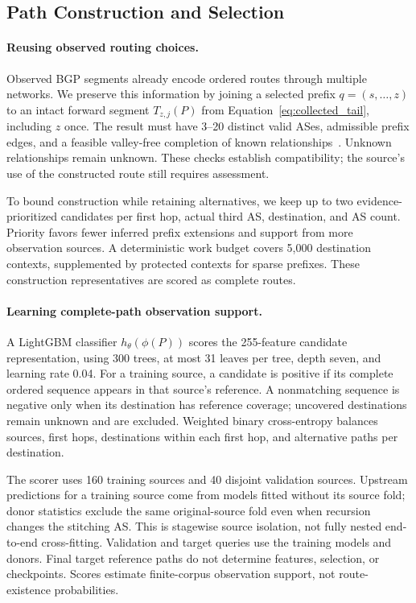 \subsection{Path Construction and Selection}
\label{sec:generation}
\label{sec:path_selection}

\paragraph{Reusing observed routing choices.}
Observed BGP segments already encode ordered routes through multiple
networks. We preserve this information by joining a selected prefix
$q=(s,\ldots,z)$ to an intact forward segment $T_{z,j}(P)$ from
Equation~\eqref{eq:collected_tail}, including $z$ once. The result must have
3--20 distinct valid ASes, admissible prefix edges, and a feasible
valley-free completion of known relationships~\cite{gao2001inferring}.
Unknown relationships remain unknown. These checks establish compatibility;
the source's use of the constructed route still requires assessment.

To bound construction while retaining alternatives, we keep up to two
evidence-prioritized candidates per first hop, actual third AS, destination,
and AS count. Priority favors fewer inferred prefix extensions and support
from more observation sources. A deterministic work budget covers 5,000
destination contexts, supplemented by protected contexts for sparse
prefixes. These construction representatives are scored as complete routes.

\paragraph{Learning complete-path observation support.}
A LightGBM classifier $h_\theta(\phi(P))$ scores the 255-feature candidate
representation, using 300 trees, at most 31 leaves per tree, depth seven,
and learning rate 0.04. For a training source, a candidate is positive if its
complete ordered sequence appears in that source's reference. A
nonmatching sequence is negative only when its destination has reference
coverage; uncovered destinations remain unknown and are excluded.
Weighted binary cross-entropy balances sources, first hops, destinations
within each first hop, and alternative paths per destination.

The scorer uses 160 training sources and 40 disjoint validation sources.
Upstream predictions for a training source come from models fitted without
its source fold; donor statistics exclude the same original-source fold
even when recursion changes the stitching AS. This is stagewise source
isolation, not fully nested end-to-end cross-fitting. Validation and target
queries use the training models and donors. Final target reference paths
do not determine features, selection, or checkpoints. Scores estimate
finite-corpus observation support, not route-existence probabilities.

